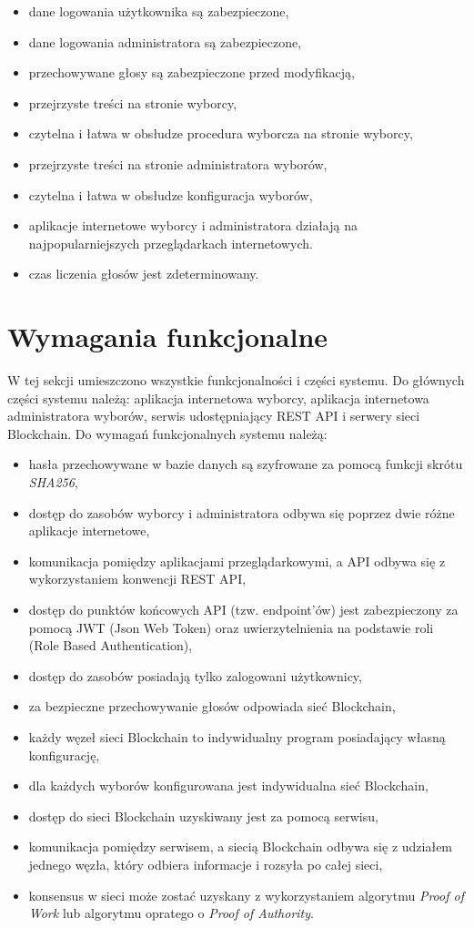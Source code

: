 \documentclass[a4paper,12pt]{book}
\begin{document}
\begin{itemize}
	\item dane logowania użytkownika są zabezpieczone,
	\item dane logowania administratora są zabezpieczone,
	\item przechowywane głosy są zabezpieczone przed modyfikacją,
	\item przejrzyste treści na stronie wyborcy,
	\item czytelna i łatwa w obsłudze procedura wyborcza na stronie wyborcy,
	\item przejrzyste treści na stronie administratora wyborów,
	\item czytelna i łatwa w obsłudze konfiguracja wyborów,
	\item aplikacje internetowe wyborcy i administratora działają na najpopularniejszych przeglądarkach internetowych.
	\item czas liczenia głosów jest zdeterminowany.
\end{itemize}

\section {Wymagania funkcjonalne}

W tej sekcji umieszczono wszystkie funkcjonalności i części systemu. Do głównych części systemu należą: aplikacja internetowa wyborcy, aplikacja internetowa administratora wyborów,
serwis udostępniający REST API i serwery sieci Blockchain. Do wymagań funkcjonalnych systemu należą:

\begin{itemize}
	\item hasła przechowywane w bazie danych są szyfrowane za pomocą funkcji skrótu \textit{SHA256},
	\item dostęp do zasobów wyborcy i administratora odbywa się poprzez dwie różne aplikacje internetowe,
	\item komunikacja pomiędzy aplikacjami przeglądarkowymi, a API odbywa się z wykorzystaniem konwencji REST API,
	\item dostęp do punktów końcowych API (tzw. endpoint'ów) jest zabezpieczony za pomocą JWT (Json Web Token) oraz uwierzytelnienia na podstawie roli (Role Based Authentication),
	\item dostęp do zasobów posiadają tylko zalogowani użytkownicy,
	\item za bezpieczne przechowywanie głosów odpowiada sieć Blockchain,
	\item każdy węzeł sieci Blockchain to indywidualny program posiadający własną konfigurację,
	\item dla każdych wyborów konfigurowana jest indywidualna sieć Blockchain,
	\item dostęp do sieci Blockchain uzyskiwany jest za pomocą serwisu,
	\item komunikacja pomiędzy serwisem, a siecią Blockchain odbywa się z udziałem jednego węzła, który odbiera informacje i rozsyła po całej sieci,
	\item konsensus w sieci może zostać uzyskany z wykorzystaniem algorytmu \textit{Proof of Work} lub algorytmu opratego o \textit{Proof of Authority}.
\end{itemize}
\end{document}
